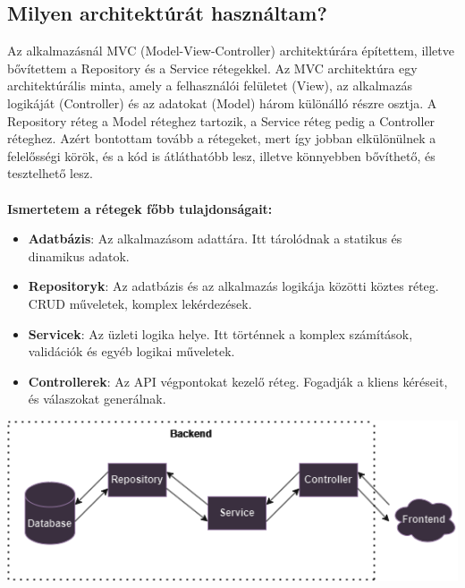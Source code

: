 \subsection*{Milyen architektúrát használtam?}
Az alkalmazásnál MVC (Model-View-Controller) architektúrára építettem, illetve
bővítettem a Repository és a Service rétegekkel. Az MVC architektúra egy
architektúrális minta, amely a felhasználói felületet (View), az alkalmazás
logikáját (Controller) és az adatokat (Model) három különálló részre osztja.
A Repository réteg a Model réteghez tartozik, a Service réteg pedig a Controller réteghez.
Azért bontottam tovább a rétegeket, mert így jobban elkülönülnek a felelősségi körök,
és a kód is átláthatóbb lesz, illetve könnyebben bővíthető, és tesztelhető lesz.
\\
\\
\textbf{Ismertetem a rétegek főbb tulajdonságait:}
\begin{itemize}
    \item \textbf{Adatbázis}: Az alkalmazásom adattára. Itt tárolódnak a statikus és dinamikus adatok.
    \item \textbf{Repositoryk}: Az adatbázis és az alkalmazás logikája közötti köztes réteg. CRUD műveletek, komplex lekérdezések.
    \item \textbf{Servicek}: Az üzleti logika helye. Itt történnek a komplex számítások, validációk és egyéb logikai műveletek.
    \item \textbf{Controllerek}: Az API végpontokat kezelő réteg. Fogadják a kliens kéréseit, és válaszokat generálnak.
\end{itemize}
\begin{center}
    \includegraphics[width=14.0truecm]{images/BackendArchitecture.png}
\end{center}